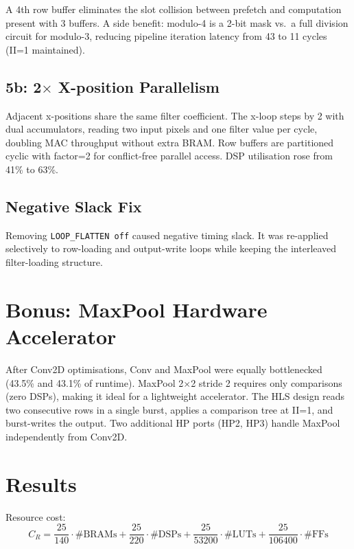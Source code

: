 \documentclass[11pt,a4paper]{article}
\begin{document}
A 4th row buffer eliminates the slot collision between prefetch and computation present
with 3 buffers. A side benefit: modulo-4 is a 2-bit mask vs.\ a full division circuit
for modulo-3, reducing pipeline iteration latency from 43 to 11 cycles (II=1 maintained).

\subsection*{5b: 2$\times$ X-position Parallelism}

Adjacent x-positions share the same filter coefficient. The x-loop steps by 2 with dual
accumulators, reading two input pixels and one filter value per cycle, doubling MAC
throughput without extra BRAM. Row buffers are partitioned cyclic with factor=2 for
conflict-free parallel access. DSP utilisation rose from 41\% to 63\%.

\subsection*{Negative Slack Fix}

Removing \texttt{LOOP\_FLATTEN off} caused negative timing slack. It was re-applied
selectively to row-loading and output-write loops while keeping the interleaved
filter-loading structure.

\section{Bonus: MaxPool Hardware Accelerator}

After Conv2D optimisations, Conv and MaxPool were equally bottlenecked (43.5\% and 43.1\%
of runtime). MaxPool 2$\times$2 stride 2 requires only comparisons (zero DSPs), making
it ideal for a lightweight accelerator. The HLS design reads two consecutive rows in a
single burst, applies a comparison tree at II=1, and burst-writes the output. Two
additional HP ports (HP2, HP3) handle MaxPool independently from Conv2D.

\section{Results}

Resource cost:
\[
  C_R = \frac{25}{140}\cdot\#\text{BRAMs}
      + \frac{25}{220}\cdot\#\text{DSPs}
      + \frac{25}{53200}\cdot\#\text{LUTs}
      + \frac{25}{106400}\cdot\#\text{FFs}
\]
\end{document}
